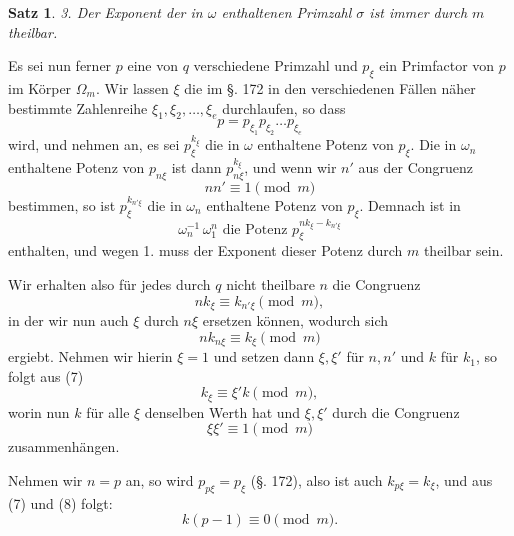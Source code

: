 \documentclass[12pt,a4paper]{article}
\newtheorem*{satz}{Satz}
\begin{document}
\begin{satz}
3. Der Exponent der in $\omega$ enthaltenen Primzahl $\sigma$ ist immer durch $m$ theilbar.
\end{satz}

Es sei nun ferner $p$ eine von $q$ verschiedene Primzahl und $p_\xi$ ein Primfactor von $p$ im Körper $\Omega_m$. Wir lassen $\xi$ die im \S. 172 in den verschiedenen Fällen näher bestimmte Zahlenreihe $\xi_1, \xi_2, \ldots, \xi_e$ durchlaufen, so dass
\begin{equation}\label{eq:181-3}
p = p_{\xi_1} p_{\xi_2} \ldots p_{\xi_e}
\end{equation}
wird, und nehmen an, es sei $p_\xi^{k_\xi}$ die in $\omega$ enthaltene Potenz von $p_\xi$. Die in $\omega_n$ enthaltene Potenz von $p_{n\xi}$ ist dann $p_{n\xi}^{k_\xi}$, und wenn wir $n'$ aus der Congruenz
\begin{equation}\label{eq:181-4}
nn' \equiv 1 \pmod{m}
\end{equation}
bestimmen, so ist $p_\xi^{k_{n'\xi}}$ die in $\omega_n$ enthaltene Potenz von $p_\xi$. Demnach ist in
\begin{equation}\label{eq:181-5}
\omega_n^{-1}\,\omega_1^n \text{ die Potenz } p_\xi^{nk_\xi - k_{n'\xi}}
\end{equation}
enthalten, und wegen 1. muss der Exponent dieser Potenz durch $m$ theilbar sein.

Wir erhalten also für jedes durch $q$ nicht theilbare $n$ die Congruenz
\begin{equation}\label{eq:181-6}
nk_\xi \equiv k_{n'\xi} \pmod{m},
\end{equation}
in der wir nun auch $\xi$ durch $n\xi$ ersetzen können, wodurch sich
\begin{equation}\label{eq:181-7}
nk_{n\xi} \equiv k_\xi \pmod{m}
\end{equation}
ergiebt. Nehmen wir hierin $\xi = 1$ und setzen dann $\xi, \xi'$ für $n, n'$ und $k$ für $k_1$, so folgt aus (7)
\begin{equation}\label{eq:181-8}
k_\xi \equiv \xi' k \pmod{m},
\end{equation}
worin nun $k$ für alle $\xi$ denselben Werth hat und $\xi, \xi'$ durch die Congruenz
\[
\xi\xi' \equiv 1 \pmod{m}
\]
zusammenhängen.

Nehmen wir $n = p$ an, so wird $p_{p\xi} = p_\xi$ (\S. 172), also ist auch $k_{p\xi} = k_\xi$, und aus (7) und (8) folgt:
\begin{equation}\label{eq:181-9}
k(p-1) \equiv 0 \pmod{m}.
\end{equation}
\end{document}
